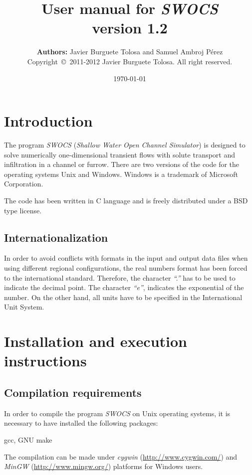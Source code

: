 \documentclass[a4paper,12pt]{report}
\title
{
	{\bf\Large User manual for \emph{SWOCS}}\\
	{\large	version 1.2}
}
\author
{
	{\bf Authors:} Javier Burguete Tolosa and Samuel Ambroj Pérez\\
	{\small Copyright~\copyright~2011-2012 Javier Burguete Tolosa.
	 All right reserved.}
}
\date{\today}
\newcommand{\swocs}{\emph{SWOCS}}
\newcommand{\IT}[1]{{\sl ``#1''}}
\begin{document}
\maketitle

\tableofcontents

\setlength{\parskip}{\baselineskip / 2}

\chapter{Introduction}

The program {\swocs} (\emph{Shallow Water Open Channel Simulator}) is designed
to solve numerically one-dimensional transient flows with solute transport and
infiltration in a channel or furrow. There are two versions of the code for the
operating systems Unix and Windows. Windows is a trademark of Microsoft
Corporation.

The code has been written in C language and is freely distributed under a BSD
type license.

\section{Internationalization}

In order to avoid conflicts with formats in the input and output data files when
using different regional configurations, the real numbers format has been forced
to the international standard. Therefore, the character \IT{.} has to be used to
indicate the decimal point. The character \IT{e}, indicates the exponential of
the number. On the other hand, all units have to be specified in the
International Unit System.

\chapter{Installation and execution instructions}

\section{Compilation requirements}

In order to compile the program {\swocs} on Unix operating systems, it is
necessary to have installed the following packages:
\begin{verbatimtab}
	gcc, GNU make
\end{verbatimtab}
The compilation can be made under \emph{cygwin} (\url{http://www.cygwin.com/})
and \emph{MinGW} (\url{http://www.mingw.org/}) platforms for Windows users.
\end{document}
